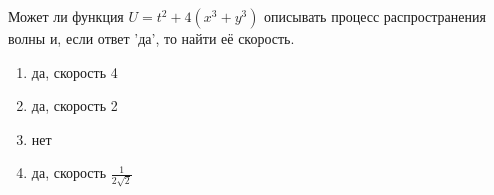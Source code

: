 Может ли функция \(U=t^2+4\left(x^3 + y^3\right)\) описывать процесс распространения волны и, если ответ 'да', то найти её скорость.

\begin{enumerate}[label=\arabic*)]
    \item да, скорость 4
    \item да, скорость 2
    \item нет
    \item да, скорость \(\frac{1}{2\sqrt{2}}\)
\end{enumerate}

